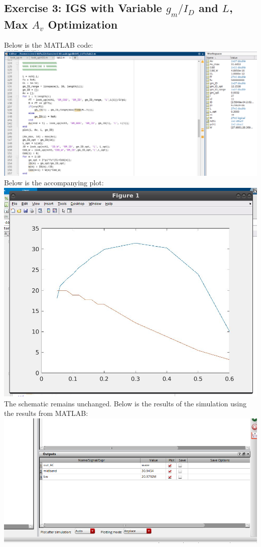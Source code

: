\documentclass[12pt, fleqn]{article}
\begin{document}
\subsection{Exercise 3: IGS with Variable $g_m / I_D$ and $L$, Max $A_v$ Optimization}
Below is the MATLAB code:\\[0.25cm]
\includegraphics[scale=0.375, center]{mat_res4.PNG}\\[0.25cm]
Below is the accompanying plot:\\[0.25cm]
\includegraphics[scale=0.375, center]{mat_res5.PNG}\\[0.25cm]
The schematic remains unchanged.  Below is the results of the simulation using the results from MATLAB:\\[0.25cm]
\includegraphics[scale=0.375, center]{sim_res4.PNG}\\[0.25cm]
\end{document}
